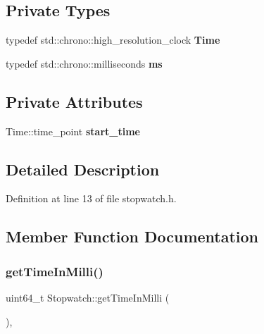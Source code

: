 \subsection*{Private Types}
\begin{DoxyCompactItemize}
\item 
\mbox{\label{classStopwatch_aa9ff69ca66fa3a4dde86ba27e03bb7b8}} 
typedef std\+::chrono\+::high\+\_\+resolution\+\_\+clock {\bfseries Time}
\item 
\mbox{\label{classStopwatch_ac126d5ce9b6c280a79630bb65e4df83a}} 
typedef std\+::chrono\+::milliseconds {\bfseries ms}
\end{DoxyCompactItemize}
\subsection*{Private Attributes}
\begin{DoxyCompactItemize}
\item 
\mbox{\label{classStopwatch_a9252f7329528193968d74bd3502f3bba}} 
Time\+::time\+\_\+point {\bfseries start\+\_\+time}
\end{DoxyCompactItemize}


\subsection{Detailed Description}


Definition at line 13 of file stopwatch.\+h.



\subsection{Member Function Documentation}
\mbox{\label{classStopwatch_a789c42b276146b4d043fac2e30684d7c}} 
\subsubsection{\texorpdfstring{get\+Time\+In\+Milli()}{getTimeInMilli()}}
{\footnotesize\ttfamily uint64\+\_\+t Stopwatch\+::get\+Time\+In\+Milli (\begin{DoxyParamCaption}{ }\end{DoxyParamCaption})\hspace{0.3cm}{\ttfamily [static]}, {\ttfamily [noexcept]}}



